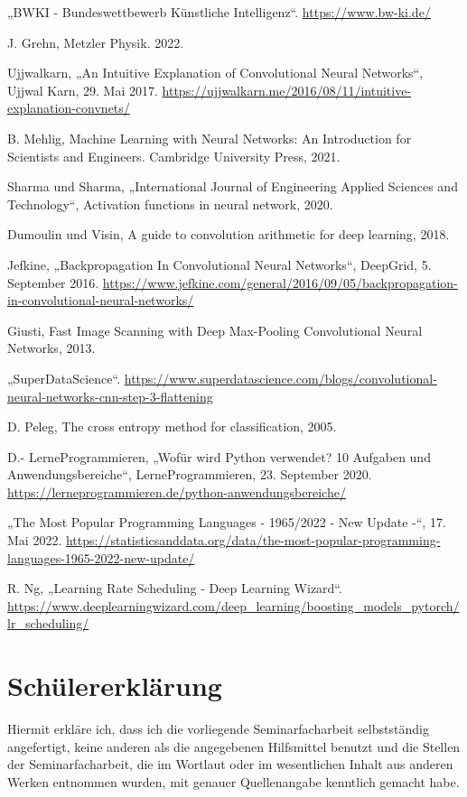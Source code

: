 \documentclass[11pt]{article}
\begin{document}
{\begin{thebibliography}{20}
    „BWKI - Bundeswettbewerb Künstliche Intelligenz“. \url{https://www.bw-ki.de/}

    J. Grehn, Metzler Physik. 2022.

    Ujjwalkarn, „An Intuitive Explanation of Convolutional Neural Networks“, Ujjwal Karn, 29. Mai 2017. \url{https://ujjwalkarn.me/2016/08/11/intuitive-explanation-convnets/}

    B. Mehlig, Machine Learning with Neural Networks: An Introduction for Scientists and Engineers. Cambridge University Press, 2021.

    Sharma und Sharma, „International Journal of Engineering Applied Sciences and Technology“, Activation functions in neural network, 2020.

    Dumoulin und Visin, A guide to convolution arithmetic for deep learning, 2018.

    Jefkine, „Backpropagation In Convolutional Neural Networks“, DeepGrid, 5. September 2016. \url{https://www.jefkine.com/general/2016/09/05/backpropagation-in-convolutional-neural-networks/}

    Giusti, Fast Image Scanning with Deep Max-Pooling Convolutional Neural Networks, 2013.

    „SuperDataScience“. \url{https://www.superdatascience.com/blogs/convolutional-neural-networks-cnn-step-3-flattening}

    D. Peleg, The cross entropy method for classification, 2005.

    D.- LerneProgrammieren, „Wofür wird Python verwendet? 10 Aufgaben und Anwendungsbereiche“, LerneProgrammieren, 23. September 2020. \url{https://lerneprogrammieren.de/python-anwendungsbereiche/}

    „The Most Popular Programming Languages - 1965/2022 - New Update -“, 17. Mai 2022. \url{https://statisticsanddata.org/data/the-most-popular-programming-languages-1965-2022-new-update/}

    R. Ng, „Learning Rate Scheduling - Deep Learning Wizard“. \url{https://www.deeplearningwizard.com/deep_learning/boosting_models_pytorch/lr_scheduling/}

\end{thebibliography}
}
\newpage
\section*{Schülererklärung}
Hiermit erkläre ich, dass ich die vorliegende Seminarfacharbeit selbstständig angefertigt,
keine anderen als die angegebenen Hilfsmittel benutzt und die Stellen der Seminarfacharbeit,
die im Wortlaut oder im wesentlichen Inhalt aus anderen Werken entnommen wurden,
mit genauer Quellenangabe kenntlich gemacht habe.
\end{document}
